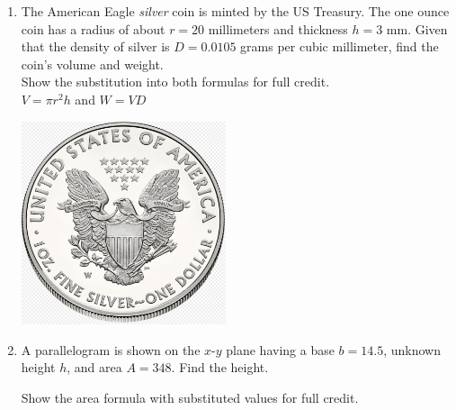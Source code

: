 \documentclass[12pt, twoside]{article}
\begin{document}
\begin{enumerate}
\newpage
\item The American Eagle \emph{silver} coin is minted by the US Treasury. The one ounce coin has a radius of about $r=20$ millimeters and thickness $h=3$ mm. Given that the density of silver is $D = 0.0105$ grams per cubic millimeter, find the coin's volume and weight. \\[0.25cm]
Show the substitution into both formulas for full credit.\\[0.5cm]
$\displaystyle V = \pi r^2 h$ and $W=VD$
  \begin{flushright}
    \includegraphics[width=6cm]{6-17-5-coin.png}
  \end{flushright}
  
  
\newpage
\item A parallelogram is shown on the $x$-$y$ plane having a base $b=14.5$, unknown height $h$, and area $A=348$. Find the height. 
  \begin{multicols}{2}
    Show the area formula with substituted values for full credit.
      \begin{flushright}
      \end{flushright}
  \end{multicols} 


\end{enumerate}
\end{document}
